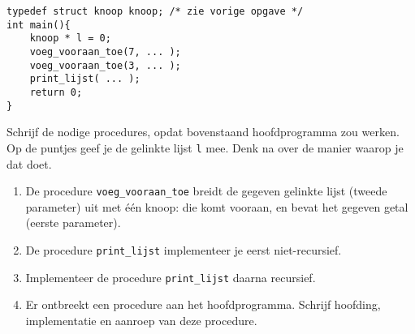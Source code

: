 \beginoef
\begin{footnotesize}
\begin{verbatim}
typedef struct knoop knoop; /* zie vorige opgave */
int main(){
    knoop * l = 0;
    voeg_vooraan_toe(7, ... );
    voeg_vooraan_toe(3, ... );
    print_lijst( ... );
    return 0;
}
\end{verbatim}
\end{footnotesize}
Schrijf de nodige procedures, opdat bovenstaand hoofdprogramma zou werken. Op de puntjes geef je de gelinkte lijst \verb}l} mee. Denk na over de manier waarop je dat doet.
\begin{enumerate}
\item 
De procedure \verb}voeg_vooraan_toe} breidt de gegeven gelinkte lijst (tweede parameter) uit met \'e\'en knoop: die komt vooraan, en bevat het gegeven getal (eerste parameter).
\item
De procedure \verb}print_lijst} implementeer je eerst niet-recursief.
\item
Implementeer de procedure \verb}print_lijst} daarna recursief. 
\item 
Er ontbreekt een procedure aan het hoofdprogramma. Schrijf hoofding, implementatie en aanroep van deze procedure.
\end{enumerate}


\endoef

